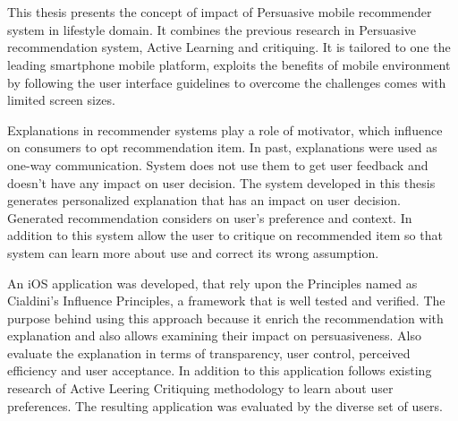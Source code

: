 \chapter{\abstractname}



This thesis presents the concept of impact of Persuasive mobile recommender system in lifestyle domain. It combines the previous research in Persuasive recommendation system, Active Learning and critiquing. It is tailored to one the leading smartphone mobile platform, exploits the benefits of mobile environment by following the user interface guidelines to overcome the challenges comes with limited screen sizes.\newline

Explanations in recommender systems play a role of motivator, which influence on consumers to opt recommendation item. In past, explanations were used as one-way communication. System does not use them to get user feedback and doesn’t have any impact on user decision. The system developed in this thesis generates personalized explanation that has an impact on user decision. Generated recommendation considers on user’s preference and context. In addition to this system allow the user to critique on recommended item so that system can learn more about use and correct its wrong assumption. \newline

An iOS application was developed, that rely upon the Principles named as Cialdini’s Influence Principles, a framework that is well tested and verified. The purpose behind using this approach because it enrich the recommendation with explanation and also allows examining their impact on persuasiveness. Also evaluate the explanation in terms of transparency, user control, perceived efficiency and user acceptance.  In addition to this application follows existing research of Active Leering Critiquing methodology to learn about user preferences.   The resulting application was evaluated by the diverse set of users.
